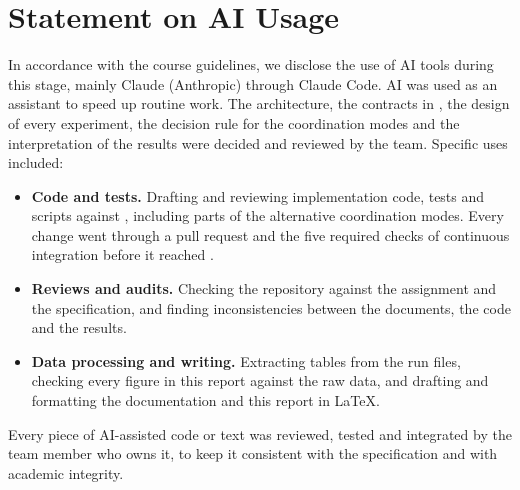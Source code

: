 \section{Statement on AI Usage}
\label{sec:ai}

In accordance with the course guidelines, we disclose the use of AI tools during this stage, mainly Claude
(Anthropic) through Claude Code. AI was used as an assistant to speed up routine work. The architecture, the contracts
in , the design of every experiment, the decision rule for the coordination modes and the interpretation
of the results were decided and reviewed by the team. Specific uses included:

\begin{itemize}
\item \textbf{Code and tests.} Drafting and reviewing implementation code, tests and scripts against ,
  including parts of the alternative coordination modes. Every change went through a pull request and the five
  required checks of continuous integration before it reached .
\item \textbf{Reviews and audits.} Checking the repository against the assignment and the specification, and finding
  inconsistencies between the documents, the code and the results.
\item \textbf{Data processing and writing.} Extracting tables from the run files, checking every figure in this report
  against the raw data, and drafting and formatting the documentation and this report in \LaTeX.
\end{itemize}

Every piece of AI-assisted code or text was reviewed, tested and integrated by the team member who owns it, to keep
it consistent with the specification and with academic integrity.
